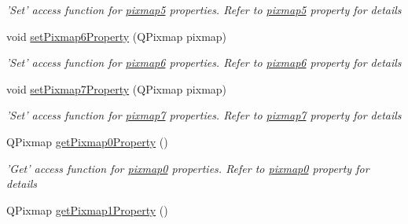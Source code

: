 \begin{DoxyCompactItemize}
\begin{DoxyCompactList}\small\item\em 'Set' access function for \hyperlink{classQELabel_a059f6c9e30a31cb7783223bfb5961ed7}{pixmap5} properties. Refer to \hyperlink{classQELabel_a059f6c9e30a31cb7783223bfb5961ed7}{pixmap5} property for details \end{DoxyCompactList}\item 
\hypertarget{classQELabel_a300f601bf8d026168fb8bf2abfcecd54}{
void \hyperlink{classQELabel_a300f601bf8d026168fb8bf2abfcecd54}{setPixmap6Property} (QPixmap pixmap)}
\label{classQELabel_a300f601bf8d026168fb8bf2abfcecd54}

\begin{DoxyCompactList}\small\item\em 'Set' access function for \hyperlink{classQELabel_aef12b4be5226b9e2660b69873f029122}{pixmap6} properties. Refer to \hyperlink{classQELabel_aef12b4be5226b9e2660b69873f029122}{pixmap6} property for details \end{DoxyCompactList}\item 
\hypertarget{classQELabel_a8ddf9546fad53a12cc4e600a150ea179}{
void \hyperlink{classQELabel_a8ddf9546fad53a12cc4e600a150ea179}{setPixmap7Property} (QPixmap pixmap)}
\label{classQELabel_a8ddf9546fad53a12cc4e600a150ea179}

\begin{DoxyCompactList}\small\item\em 'Set' access function for \hyperlink{classQELabel_a65da0ef3bc0c5f289070763c7c794e77}{pixmap7} properties. Refer to \hyperlink{classQELabel_a65da0ef3bc0c5f289070763c7c794e77}{pixmap7} property for details \end{DoxyCompactList}\item 
\hypertarget{classQELabel_ab4519f04d2a7af234d4430b110c35eba}{
QPixmap \hyperlink{classQELabel_ab4519f04d2a7af234d4430b110c35eba}{getPixmap0Property} ()}
\label{classQELabel_ab4519f04d2a7af234d4430b110c35eba}

\begin{DoxyCompactList}\small\item\em 'Get' access function for \hyperlink{classQELabel_ad99c4d55198c39bea42eb391c71e29aa}{pixmap0} properties. Refer to \hyperlink{classQELabel_ad99c4d55198c39bea42eb391c71e29aa}{pixmap0} property for details \end{DoxyCompactList}\item 
\hypertarget{classQELabel_a51a3f2a4b93148bab013996dec709fb1}{
QPixmap \hyperlink{classQELabel_a51a3f2a4b93148bab013996dec709fb1}{getPixmap1Property} ()}
\label{classQELabel_a51a3f2a4b93148bab013996dec709fb1}


\end{DoxyCompactItemize}
